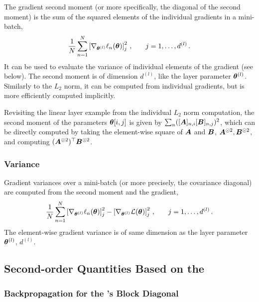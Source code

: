 The gradient second moment (or more specifically, the diagonal of the second
moment) is the sum of the squared elements of the individual gradients in a
mini-batch, \ie
\begin{align}
  \frac{1}{N} \sum_{n=1}^{N}\left[\nabla_{{\bm{\theta}}^{(l)}}\ell_n({\bm{\theta}})\right]_j^2\,{,} \qquad j = 1,\dots,d^{(l)}\,{.}
  \label{backpack::equ:second_moment}
\end{align}
It can be used to evaluate the variance of individual elements of the gradient
(see below). The second moment is of dimension $d^{(l)}$, like the layer
parameter ${\bm{\theta}}^{(l)}$. Similarly to the $L_2$ norm, it can be computed from
individual gradients, but is more efficiently computed implicitly.

Revisiting the linear layer example from the individual $L_2$ norm computation,
the second moment of the parameters ${\bm{\theta}}[i,j]$ is given by $\sum_n
([{\bm{A}}]_{n,i}[{\bm{B}}]_{n,j})^2$, which can be directly computed by taking the
element-wise square of ${\bm{A}}$ and ${\bm{B}}$, ${\bm{A}}^{\odot 2}, {\bm{B}}^{\odot 2}$, and
computing $({\bm{A}}^{\odot 2})^\top {\bm{B}}^{\odot 2}$.

\subsubsection{Variance}

Gradient variances over a mini-batch (or more precisely, the covariance
diagonal) are computed from the second moment and the gradient,
\begin{align}
  \frac{1}{N}\sum_{n=1}^{N}
  \left[\nabla_{{\bm{\theta}}^{(l)}}\ell_n({\bm{\theta}})\right]_j^2 -
  \left[\nabla_{{\bm{\theta}}^{(l)}}\mathcal{L} ({\bm{\theta}}) \right]_j^2\,{,} \qquad j = 1,\dots,d^{(l)}\,{.}
  \label{backpack::equ:variance}
\end{align}
The element-wise gradient variance is of same dimension as the layer parameter
${\bm{\theta}}^{(l)}$, \ie $d^{(l)}$.

\subsection{Second-order Quantities Based on the \ggn}
\label{backpack::app:second-order-extensions}

\subsubsection{Backpropagation for the \ggn's Block Diagonal}

